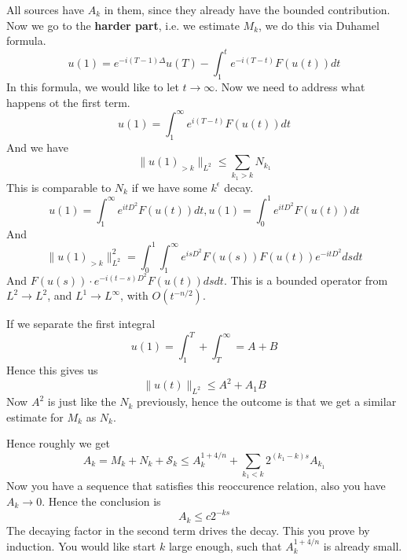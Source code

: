 All sources have $A_k$ in them, since they already have the bounded contribution. Now we go to the \textbf{harder part}, i.e. we estimate $M_k$, we do this via Duhamel formula.
\begin{equation*}
    u(1)=e^{-i(T-1)\Delta}u(T)-\int_1^t e^{-i(T-t)}F(u(t))dt
\end{equation*}
In this formula, we would like to let $t\to\infty$. Now we need to address what happens ot the first term.
\begin{equation*}
    u(1)=\int_1^\infty e^{i(T-t)}F(u(t))dt
\end{equation*}
And we have 
\begin{equation*}
    \|u(1)_{>k}\|_{L^2}\leq\sum_{k_1>k}N_{k_1}
\end{equation*}
This is comparable to $N_k$ if we have some $k^\epsilon$ decay. 
\begin{equation*}
    u(1)=\int_1^\infty e^{itD^2}F(u(t))dt, u(1)=\int_0^1 e^{itD^2}F(u(t))dt
\end{equation*}
And 
\begin{equation*}
    \|u(1)_{>k}\|_{L^2}^2=\int_0^1\int_1^\infty e^{isD^2}F(u(s))F(u(t))e^{-itD^2}dsdt
\end{equation*}
And $F(u(s))\cdot e^{-i(t-s)D^2}F(u(t))dsdt$. This is a bounded operator from $L^2\to L^2$, and $L^1\to L^\infty$, with $O(t^{-n/2})$.

If we separate the first integral
\begin{equation*}
    u(1)=\int_1^T +\int_T^\infty=A+B
\end{equation*}
Hence this gives us 
\begin{equation*}
    \|u(t)\|_{L^2}\leq A^2+A_1B
\end{equation*}
Now $A^2$ is just like the $N_k$ previously, hence the outcome is that we get a similar estimate for $M_k$ as $N_k$.

Hence roughly we get 
\begin{equation*}
    A_k=M_k+N_k+\mathcal{S}_k\leq A_k^{1+4/n}+\sum_{k_1<k}2^{(k_1-k)s}A_{k_1}
\end{equation*}
Now you have a sequence that satisfies this reoccurence relation, also you have $A_k\to 0$. Hence the conclusion is 
\begin{equation*}
    A_k\leq c 2^{-ks}
\end{equation*}
The decaying factor in the second term drives the decay. This you prove by induction. You would like start $k$ large enough, such that $A_k^{1+4/n}$ is already small.


